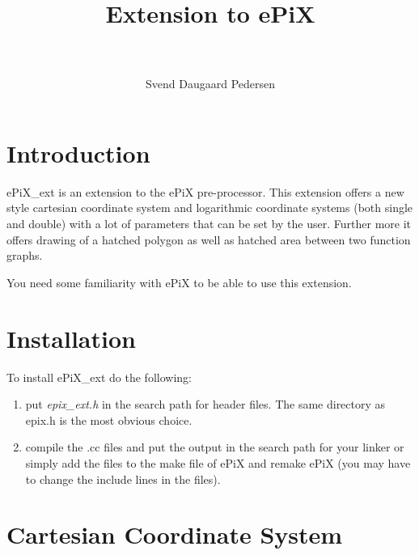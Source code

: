 \documentclass[12pt,a4paper]{article}
\begin{document}
  \lstset{language=C++,
          extendedchars=true,
          showstringspaces=false,
          stringstyle = \ttfamily,
          basicstyle=\footnotesize
         }

  \thispagestyle{empty}

  \title{\Huge \textbf{Extension to ePiX}}
  \author{\\ \\ Svend Daugaard Pedersen}
  \maketitle

  \newpage
  \tableofcontents
  \newpage

  \pagestyle{headings}  %

  \section{Introduction}

  ePiX\_ext is an extension to the ePiX pre-processor. This extension offers
  a new style cartesian coordinate system and logarithmic coordinate systems
  (both single and double) with a lot of parameters that can be set by
  the user. Further more it offers drawing of a hatched polygon as well as
  hatched area between two function graphs.

  You need some familiarity with ePiX to be able to use this extension.

  \section{Installation}

  To install ePiX\_ext do the following:

  \begin{enumerate}
  \item
    put \textit{epix\_ext.h} in the search path for header files. The same
    directory as epix.h is the most obvious choice.
  \item
    compile the .cc files and put the output in the search path for your
    linker or simp\-ly add the files to the make file of ePiX and remake ePiX
    (you may have to change the include lines in the files).
  \end{enumerate}


  \section{Cartesian Coordinate System}
\end{document}
